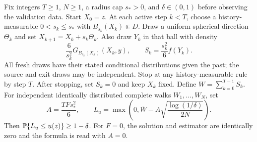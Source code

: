 \begin{proposition}
\label{prop:onesidedwos}
Fix integers $T\ge1$, $N\ge1$, a radius cap $s_*>0$, and
$\delta\in(0,1)$ before observing the validation data. Start $X_0=z$.
At each active step $k<T$, choose a history-measurable
$0<s_k\le s_*$ with $\overline B_{s_k}(X_k)\Subset D$. Draw a uniform
spherical direction $\Theta_k$ and set $X_{k+1}=X_k+s_k\Theta_k$.
Also draw $Y_k$ in that ball with density
\[
 \frac{6}{s_k^2}G_{B_{s_k}(X_k)}(X_k,y),\qquad
 S_k=\frac{s_k^2}{6}f(Y_k).
\]
All fresh draws have their stated conditional distributions given the past;
the source and exit draws may be independent. Stop at any history-measurable
rule by step $T$. After stopping, set $S_k=0$ and keep $X_k$ fixed. Define
$W=\sum_{k=0}^{T-1}S_k$. For independent identically distributed complete
walks $W_1,\ldots,W_N$, set
\begin{equation}
 A=\frac{TFs_*^2}{6},\qquad
 L_u=\max\left(0,\overline W-
 A\sqrt{\frac{\log(1/\delta)}{2N}}\right).
 \label{eq:onesidedwos}
\end{equation}
Then $\mathbb{P}\{L_u\le u(z)\}\ge1-\delta$. For $F=0$, the solution and
estimator are identically zero and the formula is read with $A=0$.
\end{proposition}
